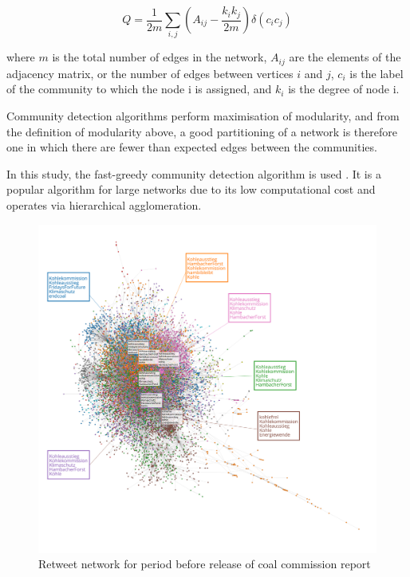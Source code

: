 \documentclass[12pt,onecolumn,twoside]{layout}
\begin{document}
\begin{equation}
\label{eq:modularity}
Q = \frac{1}{2m} \sum_{i,j} \left(A_{ij} - \frac{k_i k_j} {2m}\right) \delta (c_i c_j)
\end{equation}

where $m$ is the total number of edges in the network, $A_{ij}$ are the elements of the adjacency matrix, or the number of edges between vertices $i$ and $j$, $c_i$ is the label of the community to which the node i is assigned, and $k_i$ is the degree of node i.

Community detection algorithms perform maximisation of modularity, and from the definition of modularity above, a good partitioning of a network is therefore one in which there are fewer than expected edges between the communities.

In this study, the fast-greedy community detection algorithm is used \citep{Clauset2004}. It is a popular algorithm for large networks due to its low computational cost and operates via hierarchical agglomeration.

\begin{figure}
	\begin{center}
		\includegraphics[width=\linewidth]{figures/rt_network_ht_period4_edited2}
	\end{center}
	\caption{Retweet network for period before release of coal commission report}
	\label{fig:rt_network_bef}
\end{figure}
\end{document}
